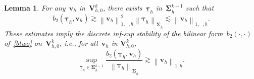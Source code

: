 \documentclass[10pt,a4paper]{amsart}
\newtheorem{lemma}{Lemma}
\newcommand{\Norm}[1]{{\left\|{#1} \right\|}}
\newcommand{\Sigmah}{\underline{\boldsymbol{\Sigma}}_h}
\newcommand{\Sigmahkmo}{\Sigmah^{k-1}}
\newcommand{\Vbf}{\mathbf{V}}
\newcommand{\Vhkz}{\Vbf_{h,0}^k}
\newcommand{\btwo}{b_2}
\DeclareMathOperator{\dev}{\underline{\mathbf{dev}}}
\newcommand{\taubfh}{\underline{\boldsymbol{\tau}}_h}
\newcommand{\vbfh}{\mathbf{v}_h}
\begin{document}
\begin{lemma} \label{lemma:discrete-inf-sup-bt}
For any~$\vbfh$ in~$\Vhkz$,
there exists~$\taubfh$ in~$\Sigmahkmo$ such that
\begin{subequations} \label{inf-sup:i-ii}
\begin{equation} \label{inf-sup:i}
\btwo(\taubfh,\vbfh) \gtrsim \Norm{\vbfh}_{1,\dev,h}^2
\end{equation}
\begin{equation} \label{inf-sup:ii}
\Norm{\taubfh}_{\Sigmah} \lesssim \Norm{\vbfh}_{1,\dev,h}.
\end{equation}
\end{subequations}
These estimates imply
the discrete inf-sup stability of the bilinear form~$\btwo(\cdot,\cdot)$ of~\eqref{btwo} on~$\Vhkz$,
i.e.,
for all~$\vbfh$ in $\Vhkz$,
\begin{equation} \label{discrete-inf-sup:btwo}
\sup_{\taubfh \in \Sigmahkmo} \frac{\btwo(\taubfh,\vbfh)}{\Norm{\taubfh}_{\Sigmah}}
    \gtrsim\Norm{\vbfh}_{1,h}.
\end{equation}
\end{lemma}
\end{document}
